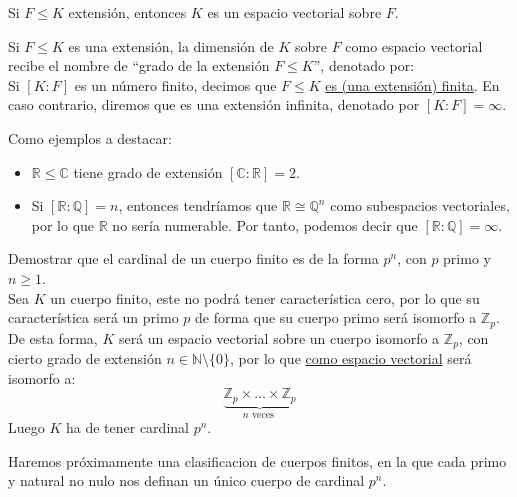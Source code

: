 \begin{observacion}
    Si $F\leq K$ extensión, entonces $K$ es un espacio vectorial sobre $F$.
\end{observacion}

\begin{definicion}
    Si $F\leq K$ es una extensión, la dimensión de $K$ sobre $F$ como espacio vectorial recibe el nombre de ``grado de la extensión $F\leq K$'', denotado por: 
    \begin{equation*}
        [K:F]
    \end{equation*}
    Si $[K:F]$ es un número finito, decimos que $F\leq K$ \underline{es (una extensión) finita}. En caso contrario, diremos que es una extensión infinita, denotado por $[K:F] = \infty$.
\end{definicion}

\begin{ejemplo}
    Como ejemplos a destacar:
    \begin{itemize}
        \item $\mathbb{R}\leq \mathbb{C}$ tiene grado de extensión $[\mathbb{C}:\mathbb{R}] = 2$.
        \item Si $[\mathbb{R}:\mathbb{Q}] = n$, entonces tendríamos que $\mathbb{R}\cong \mathbb{Q}^n$ como subespacios vectoriales, por lo que $\mathbb{R}$ no sería numerable. Por tanto, podemos decir que $[\mathbb{R}:\mathbb{Q}]=\infty$.
    \end{itemize}
\end{ejemplo}

\begin{ejercicio}
    Demostrar que el cardinal de un cuerpo finito es de la forma $p^n$, con $p$ primo y $n\geq 1$.\\

    \noindent
    Sea $K$ un cuerpo finito, este no podrá tener característica cero, por lo que su característica será un primo $p$ de forma que su cuerpo primo será isomorfo a $\mathbb{Z}_p$. De esta forma, $K$ será un espacio vectorial sobre un cuerpo isomorfo a $\mathbb{Z}_p$, con cierto grado de extensión $n\in \mathbb{N}\setminus \{0\}$, por lo que \underline{como espacio vectorial} será isomorfo a:
    \begin{equation*}
        \underbrace{\mathbb{Z}_p\times \ldots \times \mathbb{Z}_p}_{n\text{ veces }}
    \end{equation*}
    Luego $K$ ha de tener cardinal $p^n$.
\end{ejercicio}

\noindent
Haremos próximamente una clasificacion de cuerpos finitos, en la que cada primo y natural no nulo nos definan un único cuerpo de cardinal $p^n$.

